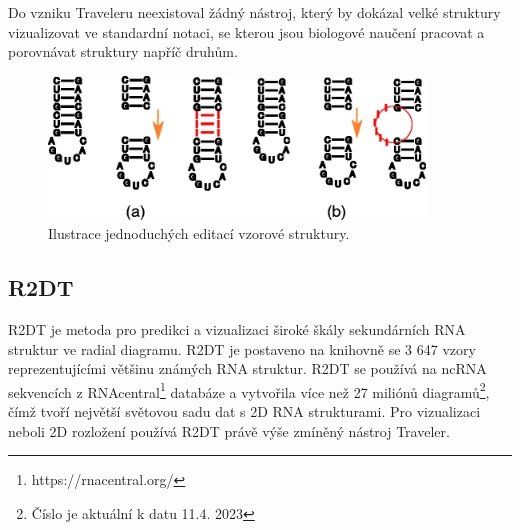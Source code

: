 Do vzniku Traveleru neexistoval žádný nástroj, který by dokázal velké struktury
vizualizovat ve standardní notaci, se kterou jsou biologové naučení pracovat a
porovnávat struktury napříč druhům.

\begin{figure}[H]
  \centering
  \includegraphics[width=100mm]{../img/kap01/editation.png}
  \caption{Ilustrace jednoduchých editací vzorové struktury.}
\end{figure}

\subsection{R2DT} 

R2DT\cite{R2DT2021} je metoda pro predikci a vizualizaci široké škály
sekundárních RNA struktur ve radial diagramu. R2DT je postaveno na knihovně se
3 647 vzory reprezentujícími většinu známých RNA struktur. R2DT se používá na
ncRNA sekvencích z RNAcentral\footnote{https://rnacentral.org/} databáze a
vytvořila více než 27 miliónů diagramů\footnote{Číslo je aktuální k datu 11.4.
2023}, čímž tvoří největší světovou sadu dat s 2D RNA strukturami. Pro
vizualizaci neboli 2D rozložení používá R2DT právě výše zmíněný nástroj
Traveler.
